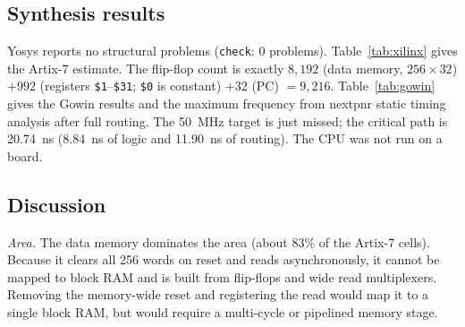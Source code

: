 \documentclass[conference]{IEEEtran}
\begin{document}
\subsection{Synthesis results}
Yosys reports no structural problems (\texttt{check}: 0 problems). Table~\ref{tab:xilinx}
gives the Artix-7 estimate. The flip-flop count is exactly
$8{,}192$ (data memory, $256\times32$) $+ 992$ (registers \texttt{\$1}--\texttt{\$31};
\texttt{\$0} is constant) $+ 32$ (PC) $=9{,}216$. Table~\ref{tab:gowin} gives the
Gowin results and the maximum frequency from nextpnr static timing analysis
after full routing. The 50~MHz target is just missed; the critical path is
20.74~ns (8.84~ns of logic and 11.90~ns of routing). The CPU was not run on a
board.

\begin{table}[!tbp]
\caption{Xilinx Artix-7 (xc7a35t) resource estimate, Yosys}
\label{tab:xilinx}
\centering
\footnotesize
{}
\end{table}

\begin{table}[!tbp]
\caption{Gowin GW5AST-138 place-and-route results (nextpnr)}
\label{tab:gowin}
\centering
\footnotesize
{}
\end{table}

\subsection{Discussion}
\emph{Area.} The data memory dominates the area (about 83\% of the Artix-7
cells). Because it clears all 256 words on reset and reads asynchronously, it
cannot be mapped to block RAM and is built from flip-flops and wide read
multiplexers. Removing the memory-wide reset and registering the read would
map it to a single block RAM, but would require a multi-cycle or pipelined
memory stage.
\end{document}
